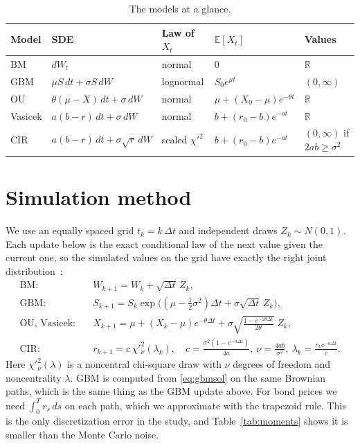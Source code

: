 \documentclass[11pt]{article}
\newcommand{\E}{\mathbb{E}}
\begin{document}
\begin{table}[h]
\centering\small
\caption{The models at a glance.}
\label{tab:models}
\begin{tabular}{@{}lllll@{}}
\toprule
Model & SDE & Law of $X_t$ & $\E[X_t]$ & Values \\
\midrule
BM      & $dW_t$                               & normal            & $0$                       & $\mathbb R$ \\
GBM     & $\mu S\,dt+\sigma S\,dW$             & lognormal         & $S_0e^{\mu t}$            & $(0,\infty)$ \\
OU      & $\theta(\mu-X)\,dt+\sigma\,dW$       & normal            & $\mu+(X_0-\mu)e^{-\theta t}$ & $\mathbb R$ \\
Vasicek & $a(b-r)\,dt+\sigma\,dW$              & normal            & $b+(r_0-b)e^{-at}$        & $\mathbb R$ \\
CIR     & $a(b-r)\,dt+\sigma\sqrt r\,dW$       & scaled $\chi'^2$  & $b+(r_0-b)e^{-at}$        & $(0,\infty)$ if $2ab\ge\sigma^2$ \\
\bottomrule
\end{tabular}
\end{table}

\section{Simulation method}
\label{sec:method}

We use an equally spaced grid $t_k=k\,\Delta t$ and independent draws $Z_k\sim N(0,1)$. Each
update below is the exact conditional law of the next value given the current one, so the
simulated values on the grid have exactly the right joint distribution~\cite{glasserman2003}:
\begin{align}
\text{BM:}\quad & W_{k+1}=W_k+\sqrt{\Delta t}\,Z_k, \\
\text{GBM:}\quad & S_{k+1}=S_k\exp\!\big((\mu-\tfrac12\sigma^2)\Delta t+\sigma\sqrt{\Delta t}\,Z_k\big), \\
\text{OU, Vasicek:}\quad & X_{k+1}=\mu+(X_k-\mu)e^{-\theta\Delta t}
   +\sigma\sqrt{\tfrac{1-e^{-2\theta\Delta t}}{2\theta}}\;Z_k, \label{eq:ouexact}\\
\text{CIR:}\quad & r_{k+1}=c\,\chi'^2_\nu(\lambda_k),\quad
   c=\tfrac{\sigma^2(1-e^{-a\Delta t})}{4a},\ \nu=\tfrac{4ab}{\sigma^2},\
   \lambda_k=\tfrac{r_ke^{-a\Delta t}}{c}. \label{eq:cirexact}
\end{align}
Here $\chi'^2_\nu(\lambda)$ is a noncentral chi-square draw with $\nu$ degrees of freedom and
noncentrality $\lambda$. GBM is computed from \eqref{eq:gbmsol} on the same Brownian paths, which
is the same thing as the GBM update above. For bond prices we need $\int_0^T r_s\,ds$ on each
path, which we approximate with the trapezoid rule. This is the only discretization error in the
study, and Table~\ref{tab:moments} shows it is smaller than the Monte Carlo noise.
\end{document}
